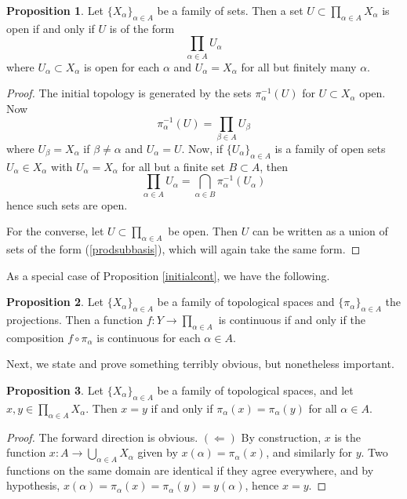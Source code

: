 \documentclass{book}
\theoremstyle{definition}
\newtheorem{proposition}{Proposition}[section]
\theoremstyle{remark}
\begin{document}
\begin{proposition}
Let $\{X_\alpha\}_{\alpha\in A}$ be a family of sets. Then a set $U\subset\prod_{\alpha\in A}X_\alpha$ is open if and only if $U$ is of the form
$$\prod_{\alpha\in A}U_\alpha$$
where $U_\alpha\subset X_\alpha$ is open for each $\alpha$ and $U_\alpha=X_\alpha$ for all but finitely many $\alpha$.
\end{proposition}
\begin{proof}
The initial topology is generated by the sets $\pi_\alpha^{-1}(U)$ for $U\subset X_\alpha$ open. Now
    $$\pi_\alpha^{-1}(U)=\prod_{\beta\in A} U_\beta$$
where $U_\beta=X_\alpha$ if $\beta\neq\alpha$ and $U_\alpha=U$. Now, if $\{U_\alpha\}_{\alpha\in A}$ is a family of open sets $U_\alpha\in X_\alpha$ with $U_\alpha=X_\alpha$ for all but a finite set $B\subset A$, then
\begin{equation}
\label{prodsubbasis}
\prod_{\alpha\in A}U_\alpha=\bigcap_{\alpha\in B}\pi_\alpha^{-1}(U_\alpha)
\end{equation}
hence such sets are open.

For the converse, let $U\subset\prod_{\alpha\in A}$ be open. Then $U$ can be written as a union of sets of the form (\ref{prodsubbasis}), which will again take the same form.
\end{proof}

As a special case of Proposition \ref{initialcont}, we have the following.

\begin{proposition}
\label{productcont}
Let $\{X_\alpha\}_{\alpha\in A}$ be a family of topological spaces and $\{\pi_\alpha\}_{\alpha\in A}$ the projections. Then a function $f:Y\to\prod_{\alpha\in A}$ is continuous if and only if the composition $f\circ\pi_\alpha$ is continuous for each $\alpha\in A$.
\end{proposition}

Next, we state and prove something terribly obvious, but nonetheless important.

\begin{proposition}\label{equality in products}
    Let $\{X_\alpha\}_{\alpha\in A}$ be a family of topological spaces, and let $x,y\in \prod_{\alpha\in A} X_\alpha$. Then $x=y$ if and only if $\pi_\alpha(x)=\pi_\alpha(y)$ for all $\alpha\in A$.
\end{proposition}
\begin{proof}
    The forward direction is obvious. $(\Leftarrow)$ By construction, $x$ is the function $x:A\to \bigcup_{\alpha\in A} X_\alpha$ given by $x(\alpha)=\pi_\alpha(x)$, and similarly for $y$. Two functions on the same domain are identical if they agree everywhere, and by hypothesis, $x(\alpha)=\pi_\alpha(x)=\pi_\alpha(y)=y(\alpha)$, hence $x=y$.
\end{proof}
\end{document}
